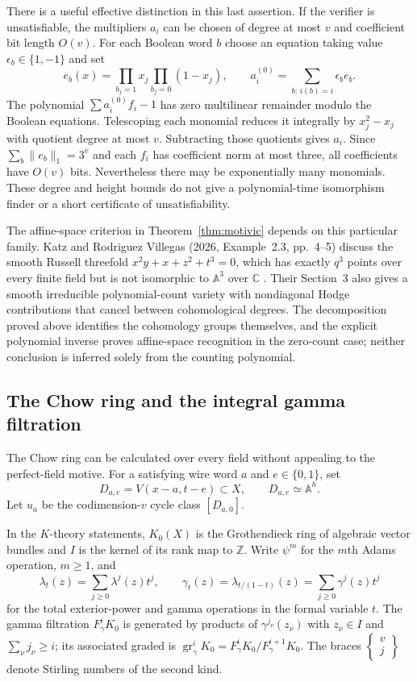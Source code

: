 There is a useful effective distinction in this last assertion. If the verifier is unsatisfiable, the multipliers $a_i$ can be chosen of degree at most $v$ and coefficient bit length $O(v)$. For each Boolean word $b$ choose an equation taking value $\epsilon_b\in\{1,-1\}$ and set
\[
 e_b(x)=\prod_{b_j=1}x_j\prod_{b_j=0}(1-x_j),\qquad
 a_i^{(0)}=\sum_{b:\,i(b)=i}\epsilon_b e_b.
\]
The polynomial $\sum a_i^{(0)}f_i-1$ has zero multilinear remainder modulo the Boolean equations. Telescoping each monomial reduces it integrally by $x_j^2-x_j$ with quotient degree at most $v$. Subtracting those quotients gives $a_i$. Since $\sum_b\|e_b\|_1=3^v$ and each $f_i$ has coefficient norm at most three, all coefficients have $O(v)$ bits. Nevertheless there may be exponentially many monomials. These degree and height bounds do not give a polynomial-time isomorphism finder or a short certificate of unsatisfiability.

The affine-space criterion in Theorem~\ref{thm:motivic} depends on this particular family. Katz and Rodriguez Villegas (2026, Example~2.3, pp.~4--5) discuss the smooth Russell threefold $x^2y+x+z^2+t^3=0$, which has exactly $q^3$ points over every finite field but is not isomorphic to $\mathbb A^3$ over $\mathbb C$ \cite{ff-katz-rv}. Their Section~3 also gives a smooth irreducible polynomial-count variety with nondiagonal Hodge contributions that cancel between cohomological degrees. The decomposition proved above identifies the cohomology groups themselves, and the explicit polynomial inverse proves affine-space recognition in the zero-count case; neither conclusion is inferred solely from the counting polynomial.

\subsection{The Chow ring and the integral gamma filtration}
The Chow ring can be calculated over every field without appealing to the perfect-field motive. For a satisfying wire word $a$ and $e\in\{0,1\}$, set
\[
 D_{a,e}=V(x-a,t-e)\subset X,\qquad D_{a,e}\simeq\mathbb A^h.
\]
Let $u_a$ be the codimension-$v$ cycle class $[D_{a,0}]$.

In the $K$-theory statements, $K_0(X)$ is the Grothendieck ring of algebraic vector bundles and $I$ is the kernel of its rank map to $\mathbb Z$. Write $\psi^m$ for the $m$th Adams operation, $m\geq1$, and
\[
 \lambda_t(z)=\sum_{j\geq0}\lambda^j(z)t^j,\qquad
 \gamma_t(z)=\lambda_{t/(1-t)}(z)=\sum_{j\geq0}\gamma^j(z)t^j
\]
for the total exterior-power and gamma operations in the formal variable $t$. The gamma filtration $F_\gamma^iK_0$ is generated by products of $\gamma^{j_\nu}(z_\nu)$ with $z_\nu\in I$ and $\sum_\nu j_\nu\geq i$; its associated graded is $\operatorname{gr}_\gamma^iK_0=F_\gamma^iK_0/F_\gamma^{i+1}K_0$. The braces $\left\{\begin{smallmatrix}v\\j\end{smallmatrix}\right\}$ denote Stirling numbers of the second kind.

